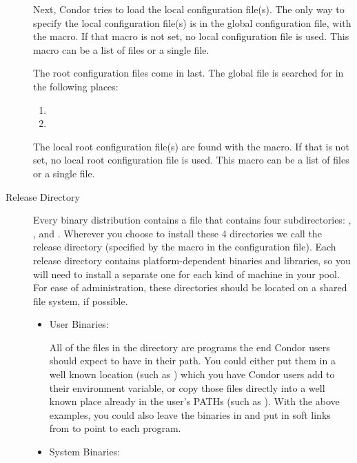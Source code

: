 \begin{description}
Next, Condor tries to load the local configuration file(s).
The only way to specify the local configuration file(s) is in the global configuration
file, with the  macro.  If that macro is not
set, no local configuration file is used.  This macro can be a list of files
or a single file.

The root configuration files come in last.  The global file is searched for
in the following places:
\begin{enumerate}
   \item {}
   \item {}
\end{enumerate}

The local root configuration file(s) are found with the
 macro.  If that is not set, no local
root configuration file is used.  This
macro can be a list of files or a single file.

\item[Release Directory]

Every binary distribution contains a  file that contains
four subdirectories: , ,  and .
Wherever you
choose to install these 4 directories we call the release directory
(specified by the  macro in the configuration file).
Each
release directory contains platform-dependent binaries and libraries,
so you will need to install a separate one for each kind of machine in
your pool.  For ease of administration, these directories should be
located on a shared file system, if possible.

\begin{itemize}
     \item User Binaries:

     All of the files in the  directory are programs the end
     Condor users should expect to have in their path.  You could
     either put them in a well known location (such as
     ) which you have Condor users add to
     their  environment variable, or copy those files
     directly into a well known place already in the user's PATHs (such as
     ).  With the above examples, you could also
     leave the binaries in  and put in
     soft links from  to point to each program.

     \item System Binaries:


\end{itemize}
\end{description}
